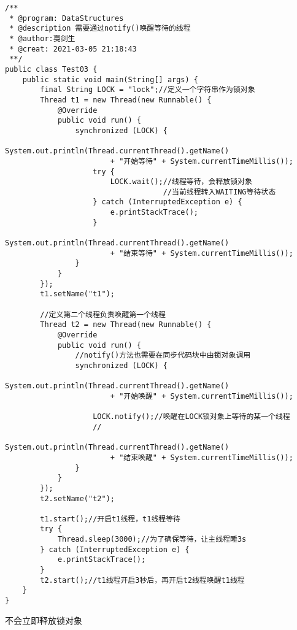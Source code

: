 \documentclass[a4paper]{report}
\begin{document}
\begin{Verbatim}[frame=single,numbersep=5pt,xleftmargin=1.5em,xrightmargin=1.5em]
/**
 * @program: DataStructures
 * @description 需要通过notify()唤醒等待的线程
 * @author:戛剑生
 * @creat: 2021-03-05 21:18:43
 **/
public class Test03 {
    public static void main(String[] args) {
        final String LOCK = "lock";//定义一个字符串作为锁对象
        Thread t1 = new Thread(new Runnable() {
            @Override
            public void run() {
                synchronized (LOCK) {
                    System.out.println(Thread.currentThread().getName() 
                        + "开始等待" + System.currentTimeMillis());
                    try {
                        LOCK.wait();//线程等待，会释放锁对象
                                    //当前线程转入WAITING等待状态
                    } catch (InterruptedException e) {
                        e.printStackTrace();
                    }
                    System.out.println(Thread.currentThread().getName() 
                        + "结束等待" + System.currentTimeMillis());
                }
            }
        });
        t1.setName("t1");

        //定义第二个线程负责唤醒第一个线程
        Thread t2 = new Thread(new Runnable() {
            @Override
            public void run() {
                //notify()方法也需要在同步代码块中由锁对象调用
                synchronized (LOCK) {
                    System.out.println(Thread.currentThread().getName() 
                        + "开始唤醒" + System.currentTimeMillis());

                    LOCK.notify();//唤醒在LOCK锁对象上等待的某一个线程
                    //
                    System.out.println(Thread.currentThread().getName() 
                        + "结束唤醒" + System.currentTimeMillis());
                }
            }
        });
        t2.setName("t2");

        t1.start();//开启t1线程，t1线程等待
        try {
            Thread.sleep(3000);//为了确保等待，让主线程睡3s
        } catch (InterruptedException e) {
            e.printStackTrace();
        }
        t2.start();//t1线程开启3秒后，再开启t2线程唤醒t1线程
    }
}\end{Verbatim}

不会立即释放锁对象
\end{document}
